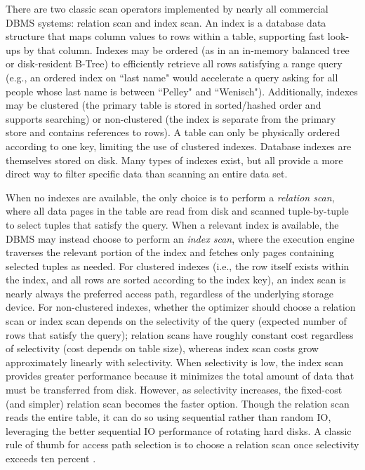 There are two classic scan operators implemented by nearly all commercial DBMS systems: relation scan and index scan.
An index is a database data structure that maps column values to rows within a table, supporting fast look-ups by that column.
Indexes may be ordered (as in an in-memory balanced tree or disk-resident B-Tree) to efficiently retrieve all rows satisfying a range query (e.g., an ordered index on ``last name" would accelerate a query asking for all people whose last name is between ``Pelley" and ``Wenisch").
Additionally, indexes may be clustered (the primary table is stored in sorted/hashed order and supports searching) or non-clustered (the index is separate from the primary store and contains references to rows).
A table can only be physically ordered according to one key, limiting the use of clustered indexes.
Database indexes are themselves stored on disk.
Many types of indexes exist, but all provide a more direct way to filter specific data than scanning an entire data set.

When no indexes are available, the only choice is to perform a \emph{relation scan}, where all data pages in the table are read from disk and scanned tuple-by-tuple to select tuples that satisfy the query.
When a relevant index is available, the DBMS may instead choose to perform an \emph{index scan}, where the execution engine traverses the relevant portion of the index and fetches only pages containing selected tuples as needed.
For clustered indexes (i.e., the row itself exists within the index, and all rows are sorted according to the index key), an index scan is nearly always the preferred access path, regardless of the underlying storage device.  
For non-clustered indexes, whether the optimizer should choose a relation scan or index scan depends on the selectivity of the query (expected number of rows that satisfy the query); relation scans have roughly constant cost regardless of selectivity (cost depends on table size), whereas index scan costs grow approximately linearly with selectivity.
When selectivity is low, the index scan provides greater performance because it minimizes the total amount of data that must be transferred from disk.
However, as selectivity increases, the fixed-cost (and simpler) relation scan becomes the faster option.  
Though the relation scan reads the entire table, it can do so using sequential rather than random IO, leveraging the better sequential IO performance of rotating hard disks.
A classic rule of thumb for access path selection is to choose a relation scan once selectivity exceeds ten percent \cite{RamakrishnanAndGehrke}.

